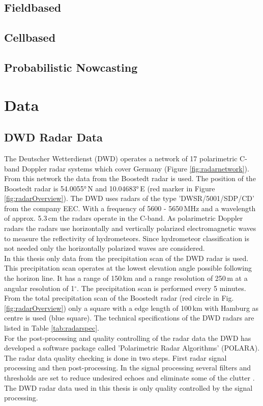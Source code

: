 \documentclass[11pt,twoside,a4paper,fleqn,x11names]{report}
\renewcommand{\deg}{\ensuremath{^{\circ}}}  %
\numberwithin{equation}{chapter}
\numberwithin{figure}{chapter}
\numberwithin{table}{chapter}
\begin{document}
\section{Fieldbased}
\section{Cellbased}
\section{Probabilistic Nowcasting}
\chapter{Data}
\label{chap:data}
\section{DWD Radar Data}
The Deutscher Wetterdienst (DWD) operates a network of 17 polarimetric C-band Doppler radar systems which cover Germany (Figure \ref{fig:radarnetwork}). From this network the data from the Boostedt radar is used. The position of the Boostedt radar is 54.0055°\,N and 10.04683°\,E (red marker in Figure \ref{fig:radarOverview}). The DWD uses radars of the type 'DWSR/5001/SDP/CD' from the company EEC. With a frequency of 5600 - 5650\,MHz and a wavelength of approx. 5.3\,cm the radars operate in the C-band. As polarimetric Doppler radars the radars use horizontally and vertically polarized electromagnetic waves to measure the  reflectivity of hydrometeors. Since hydrometeor classification is not needed only the horizontally polarized waves are considered. \\
In this thesis only data from the precipitation scan of the DWD radar is used. This precipitation scan operates at the lowest elevation angle possible following the horizon line. It has a range of 150\,km and a range resolution of 250\,m at a angular resolution of 1\deg. The precipitation scan is performed every 5 minutes. From the total precipitation scan of the Boostedt radar (red circle in Fig. \ref{fig:radarOverview}) only a square with a edge length of 100\,km with Hamburg as centre is used (blue square). The technical specifications of the DWD radars are listed in Table \ref{tab:radarspec}.\\
For the post-processing and quality controlling of the radar data the DWD has developed a software package called 'Polarimetric Radar Algorithms' (POLARA). The radar data quality checking is done in two steps. First radar signal processing and then post-processing. In the signal processing several filters and thresholds are set to reduce undesired echoes and eliminate some  of the clutter \citep{Werner2014}. The DWD radar data used in this thesis is only quality controlled by the signal processing.
\end{document}
